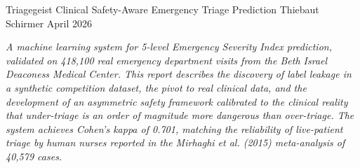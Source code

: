 \documentclass[11pt,a4paper,openany]{report}
\begin{document}
\vgtitlepage
    {Triagegeist}
    {Clinical Safety-Aware Emergency Triage Prediction}
    {Thiebaut Schirmer}
    {April 2026}

\begin{center}
\begin{minipage}{0.85\textwidth}
\small\textit{
A machine learning system for 5-level Emergency Severity Index prediction,
validated on 418,100 real emergency department visits from the Beth Israel
Deaconess Medical Center. This report describes the discovery of label leakage
in a synthetic competition dataset, the pivot to real clinical data, and the
development of an asymmetric safety framework calibrated to the clinical reality
that under-triage is an order of magnitude more dangerous than over-triage.
The system achieves Cohen's kappa of 0.701, matching the reliability of
live-patient triage by human nurses reported in the Mirhaghi et al. (2015)
meta-analysis of 40,579 cases.
}
\end{minipage}
\end{center}

\vspace{2em}



\tableofcontents
\clearpage

\listoffigures
\clearpage















% 

\appendix


\printbibliography[heading=bibintoc, title={References}]
\end{document}
